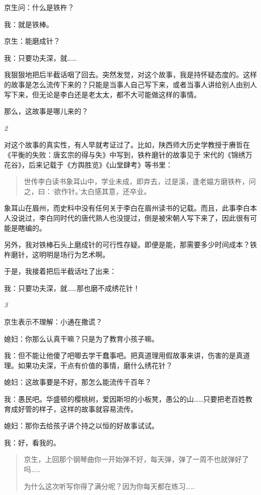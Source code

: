 \documentclass[twoside,openright,headings=optiontohead]{ctexbook} %
\begin{document}
{京生问：什么是铁杵？

我：就是铁棒。

京生：能磨成针？

我：只要功夫深，就\ldots{}\ldots{}

我狠狠地把后半截话咽了回去。突然发觉，对这个故事，我是持怀疑态度的。这样的故事是怎么流传下来的？只能是当事人自己写下来，或者当事人讲给别人由别人写下来，但无论是李白还是老太太，都不大可能做这样的事情。

那么，这故事是哪儿来的？

\emph{2}

对这个故事的真实性，有人早就考证过了。比如，陕西师大历史学教授于赓哲在《平衡的失败：唐玄宗的得与失》中写到，铁杵磨针的故事见于
宋代的《锦绣万花谷》，后来记载于《方舆胜览》《山堂肆考》等书里：

\begin{quote}
世传李白读书象耳山中，学业未成，即弃去，过是溪，逢老媪方磨铁杵，问之，曰：`欲作针。'太白感其意，还卒业。
\end{quote}

象耳山在眉州，而史料中没有任何关于李白在眉州读书的记载。而且，此事李白本人没说过，李白同时代的唐代熟人也没提过，倒是被宋朝人写下来了，因此很有可能是瞎编的。

另外，我对铁棒石头上磨成针的可行性存疑。即便是能，那需要多少时间成本？铁杵磨针，这明明是场行为艺术啊。

于是，我接着把后半截话吐了出来：

我：只要功夫深，就\ldots{}\ldots{}那也磨不成绣花针！

\emph{3}

京生表示不理解：小通在撒谎？

媳妇：你那么认真干嘛？只是为了教育小孩子嘛。

我：但不能让他傻了吧唧去学干蠢事吧。把真道理用假故事来讲，伤害的是真道理。如果功夫深，干点有价值的事情，磨什么绣花针？

媳妇：这故事要是不好，那怎么能流传千百年？

我：愚民吧。华盛顿的樱桃树，爱因斯坦的小板凳，愚公的山\ldots{}\ldots{}只要把老百姓教育成好管的样子，这样的故事就容易流传。

媳妇：那你去给孩子讲个持之以恒的好故事试试。

我：好，看我的。

\begin{quote}
京生，上回那个钢琴曲你一开始弹不好，每天弹，弹了一周不也就弹好了吗\ldots{}\ldots{}

为什么这次听写你得了满分呢？因为你每天都在练习\ldots{}\ldots{}


\end{quote}}
\end{document}
